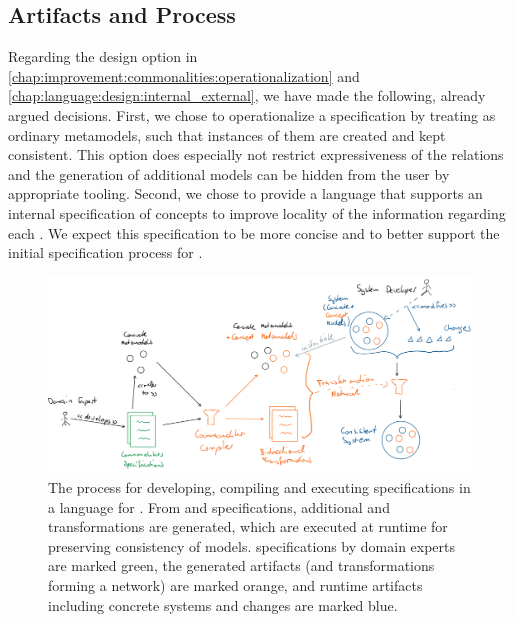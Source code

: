 \subsection{Artifacts and Process}
\label{chap:language:design:artifacts_process}

Regarding the design option in \autoref{chap:improvement:commonalities:operationalization} and \autoref{chap:language:design:internal_external}, we have made the following, already argued decisions.
First, we chose to operationalize a specification by treating \conceptmetamodels as ordinary metamodels, such that instances of them are created and kept consistent.
This option does especially not restrict expressiveness of the relations and the generation of additional models can be hidden from the user by appropriate tooling.
Second, we chose to provide a language that supports an internal specification of concepts to improve locality of the information regarding each \commonality.
We expect this specification to be more concise and to better support the initial specification process for \commonalities.

\begin{figure}
    \centering
    \includegraphics[width=\textwidth]{figures/quality/language/overall_process.png}
    \caption[Process and artifacts using a language for \commonalities]{The process for developing, compiling and executing specifications in a language for \commonalities. From \concretemetamodels and \commonalities specifications, additional \conceptmetamodels and transformations are generated, which are executed at runtime for preserving consistency of models.
    \Commonalities specifications by domain experts are marked green, the generated artifacts (\conceptmetamodels and transformations forming a network) are marked orange, and runtime artifacts including concrete systems and changes are marked blue.}
    \label{fig:language:process}
\end{figure}

